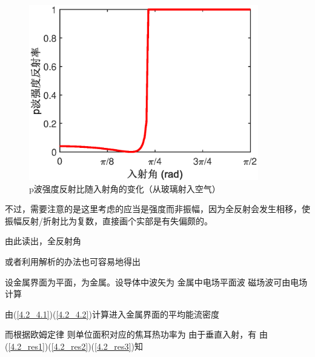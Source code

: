     \begin{figure}[htbp]
        \centering
        \includegraphics[width=10cm]{img/4.2/drei.eps}
        \caption{p波强度反射比随入射角的变化（从玻璃射入空气）}
        \label{4.2_fig:强度比随入射角的变化（从玻璃射入空气）}
    \end{figure}
    
    不过，需要注意的是这里考虑的应当是强度而非振幅，因为全反射会发生相移，使振幅反射/折射比为复数，直接画个实部是有失偏颇的。
    
    由此读出，全反射角
    
    或者利用解析的办法也可容易地得出
    

    设金属界面为平面，为金属。设导体中波矢为
    金属中电场平面波
    磁场波可由电场计算
    
    由(\ref{4.2_4.1})(\ref{4.2_4.2})计算进入金属界面的平均能流密度
    
    而根据欧姆定律
    \equa{\j=\sigma\e}
    则单位面积对应的焦耳热功率为
    由于垂直入射，有
    由(\ref{4.2_res1})(\ref{4.2_res2})(\ref{4.2_res3})知
    
